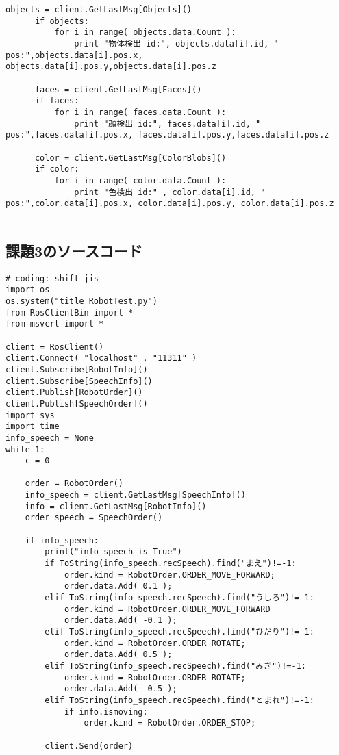 \documentclass[10pt,a4j]{jsarticle}
\begin{document}
\begin{lstlisting}[caption=VisionTest.py, label=p4_txt]
      objects = client.GetLastMsg[Objects]()
      if objects:
          for i in range( objects.data.Count ):
              print "物体検出 id:", objects.data[i].id, " pos:",objects.data[i].pos.x, objects.data[i].pos.y,objects.data[i].pos.z
  
      faces = client.GetLastMsg[Faces]()
      if faces:
          for i in range( faces.data.Count ):
              print "顔検出 id:", faces.data[i].id, " pos:",faces.data[i].pos.x, faces.data[i].pos.y,faces.data[i].pos.z
  
      color = client.GetLastMsg[ColorBlobs]()
      if color:
          for i in range( color.data.Count ):
              print "色検出 id:" , color.data[i].id, " pos:",color.data[i].pos.x, color.data[i].pos.y, color.data[i].pos.z
  
\end{lstlisting}
  

\subsection{課題3のソースコード}
  \begin{lstlisting}[caption=RobotTest.py, label=p4_txt]
# coding: shift-jis
import os
os.system("title RobotTest.py")
from RosClientBin import *
from msvcrt import *

client = RosClient()
client.Connect( "localhost" , "11311" )
client.Subscribe[RobotInfo]()
client.Subscribe[SpeechInfo]()
client.Publish[RobotOrder]()
client.Publish[SpeechOrder]()
import sys
import time
info_speech = None
while 1:
    c = 0

    order = RobotOrder()
    info_speech = client.GetLastMsg[SpeechInfo]()
    info = client.GetLastMsg[RobotInfo]()
    order_speech = SpeechOrder()

    if info_speech:
        print("info speech is True")
        if ToString(info_speech.recSpeech).find("まえ")!=-1:
            order.kind = RobotOrder.ORDER_MOVE_FORWARD;
            order.data.Add( 0.1 );
        elif ToString(info_speech.recSpeech).find("うしろ")!=-1:
            order.kind = RobotOrder.ORDER_MOVE_FORWARD
            order.data.Add( -0.1 );
        elif ToString(info_speech.recSpeech).find("ひだり")!=-1:
            order.kind = RobotOrder.ORDER_ROTATE;
            order.data.Add( 0.5 );
        elif ToString(info_speech.recSpeech).find("みぎ")!=-1:
            order.kind = RobotOrder.ORDER_ROTATE;
            order.data.Add( -0.5 );
        elif ToString(info_speech.recSpeech).find("とまれ")!=-1:
            if info.ismoving:
                order.kind = RobotOrder.ORDER_STOP;

        client.Send(order)
\end{lstlisting}
\end{document}
